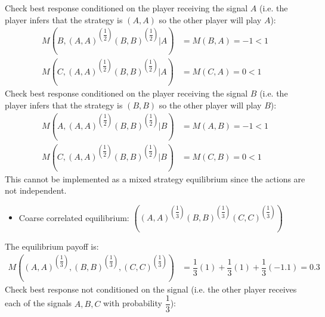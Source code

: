 \documentclass{article}
\begin{document}
Check best response conditioned on the player receiving the signal $A $ (i.e. the player infers that the strategy is $\left(A , A \right)$ so the other player will play $A $):
\begin{align*}
M\left(B, \left(A,A\right)^{\left(\dfrac{1}{2}\right)}\left(B,B\right)^{\left(\dfrac{1}{2}\right)} | A\right)  &= M\left(B, A\right) = -1 < 1
\\ M\left(C, \left(A,A\right)^{\left(\dfrac{1}{2}\right)}\left(B,B\right)^{\left(\dfrac{1}{2}\right)} | A\right)  &= M\left(C, A\right) = 0 < 1
\end{align*}
Check best response conditioned on the player receiving the signal $B $ (i.e. the player infers that the strategy is $\left(B , B \right)$ so the other player will play $B $):
\begin{align*}
M\left(A, \left(A,A\right)^{\left(\dfrac{1}{2}\right)}\left(B,B\right)^{\left(\dfrac{1}{2}\right)} | B\right)  &= M\left(A, B\right) = -1 < 1
\\ M\left(C, \left(A,A\right)^{\left(\dfrac{1}{2}\right)}\left(B,B\right)^{\left(\dfrac{1}{2}\right)} | B\right)  &= M\left(C, B\right) = 0 < 1
\end{align*}
This cannot be implemented as a mixed strategy equilibrium since the actions are not independent.
\begin{itemize}
\item Coarse correlated equilibrium: $\left(\left(A,A \right)^{\left(\dfrac{1}{3}\right)}\left(B,B\right)^{\left(\dfrac{1}{3}\right)}\left(C,C\right)^{\left(\dfrac{1}{3}\right)}\right)$
\end{itemize}The equilibrium payoff is:
\begin{align*}
M\left(\left(A,A\right)^{\left(\dfrac{1}{3}\right)},\left(B,B\right)^{\left(\dfrac{1}{3}\right)},\left(C,C\right)^{\left(\dfrac{1}{3}\right)}\right)  &= \dfrac{1}{3} \left(1\right) + \dfrac{1}{3} \left(1\right) + \dfrac{1}{3} \left(-1.1\right) = 0.3
\end{align*}
Check best response not conditioned on the signal (i.e. the other player receives each of the signals $A , B , C $ with probability $\dfrac{1}{3}$):
\end{document}
